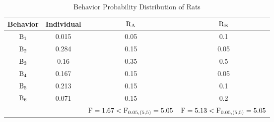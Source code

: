\begin{table}[b]
    \caption{Behavior Probability Distribution of Rats}
    \centering
    \begin{tabular}{cccc}
            \hline
            Behavior & Individual & $\rm R_A$ & $\rm R_B$ \\
            \hline
            $\rm B_1$ & 0.015 & 0.05 & 0.1 \\
            $\rm B_2$ & 0.284 & 0.15 & 0.05 \\
            $\rm B_3$ & 0.16 & 0.35 & 0.5 \\
            $\rm B_4$ & 0.167 & 0.15 & 0.05 \\
            $\rm B_5$ & 0.213 & 0.15 & 0.1 \\
            $\rm B_6$ & 0.071 & 0.15 & 0.2 \\
             &  & ${\rm F}=1.67<{\rm F}_{0.05,(5,5)}=5.05$ & ${\rm F}=5.13<{\rm F}_{0.05,(5,5)}=5.05$ \\
            \hline
            \end{tabular}
    \label{table:Behavior Probability Distribution of Rats}
\end{table}
